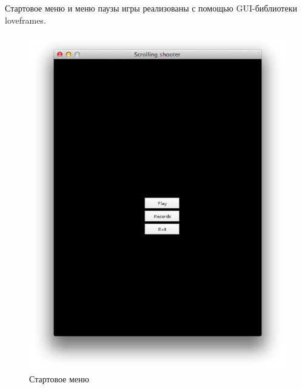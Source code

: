 \documentclass[12pt]{article}
\begin{document}
Стартовое меню и меню паузы игры реализованы с помощью GUI-библиотеки loveframes.~\cite{love}

\begin{figure}[!htb]
  \centering
    \includegraphics[scale=0.5]{pics/start.png}
   \caption{Стартовое меню}
    \label{fig:start}
\end{figure}
\end{document}
